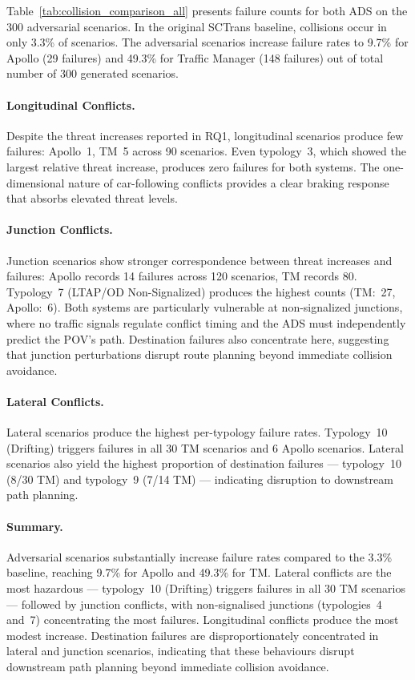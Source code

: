 Table~\ref{tab:collision_comparison_all} presents failure counts for both ADS on the 300 adversarial scenarios. In the original SCTrans baseline, collisions occur in only 3.3\% of scenarios. The adversarial scenarios increase failure rates to 9.7\% for Apollo (29 failures) and 49.3\% for Traffic Manager (148 failures) out of total number of 300 generated scenarios.

\paragraph{Longitudinal Conflicts.}
Despite the threat increases reported in RQ1, longitudinal scenarios produce few failures: Apollo~1, TM~5 across 90 scenarios. Even typology~3, which showed the largest relative threat increase, produces zero failures for both systems. The one-dimensional nature of car-following conflicts provides a clear braking response that absorbs elevated threat levels.

\paragraph{Junction Conflicts.}
Junction scenarios show stronger correspondence between threat increases and failures: Apollo records 14 failures across 120 scenarios, TM records 80. Typology~7 (LTAP/OD Non-Signalized) produces the highest counts (TM:~27, Apollo:~6). Both systems are particularly vulnerable at non-signalized junctions, where no traffic signals regulate conflict timing and the ADS must independently predict the POV's path. Destination failures also concentrate here, suggesting that junction perturbations disrupt route planning beyond immediate collision avoidance.

\paragraph{Lateral Conflicts.}
Lateral scenarios produce the highest per-typology failure rates. Typology~10 (Drifting) triggers failures in all 30 TM scenarios and 6 Apollo scenarios. Lateral scenarios also yield the highest proportion of destination failures --- typology~10 (8/30 TM) and typology~9 (7/14 TM) --- indicating disruption to downstream path planning.

\paragraph{Summary.}
Adversarial scenarios substantially increase failure rates compared to the 3.3\% baseline, reaching 9.7\% for Apollo and 49.3\% for TM. Lateral conflicts are the most hazardous --- typology~10 (Drifting) triggers failures in all 30 TM scenarios --- followed by junction conflicts, with non-signalised junctions (typologies~4 and~7) concentrating the most failures. Longitudinal conflicts produce the most modest increase. Destination failures are disproportionately concentrated in lateral and junction scenarios, indicating that these behaviours disrupt downstream path planning beyond immediate collision avoidance.

